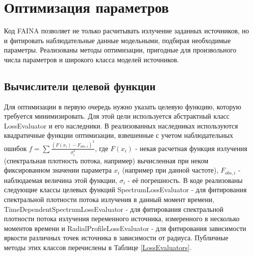 \chapter{Оптимизация параметров}\label{optimization}
Код FAINA позволяет не только расчитывать излучение заданных источников, но и фитировать наблюдательные данные модельными, подбирая необходимые параметры. Реализованы методы оптимизации, пригодные для произвольного числа параметров и широкого класса моделей источников.

\section{Вычислители целевой функции}

Для оптимизации в первую очередь нужно указать целевую функцию, которую требуется минимизировать. Для этой цели используется абстрактный класс LossEvaluator и его наследники. В реализованных наследниках используются квадратичные функции оптимизации, взвешенные с учетом наблюдательных ошибок $f = \sum \frac{(F(x_i) - F_{obs,i})^2}{\sigma_i^2}$, где $F(x_i)$ - некая расчетная функция излучения (спектральная плотность потока, например) вычисленная при неком фиксированном значении параметра $x_i$ (например при данной частоте), $F_{obs,i}$ - наблюдаемая величина этой функции, $\sigma_i$ - её погрешность. В коде реализованы следующие классы целевых функций SpectrumLossEvaluator - для фитирования спектральной плотности потока излучения в данный момент времени, TimeDependentSpectrumLossEvaluator - для фитирования спектральной плотности потока излучения переменного источника, измеренного в несколько моментов времени и RadialProfileLossEvaluator - для фитирования зависимости яркости различных точек источника в зависимости от радиуса. Публичные методы этих классов перечислены в Таблице \ref{LossEvaluators}.

